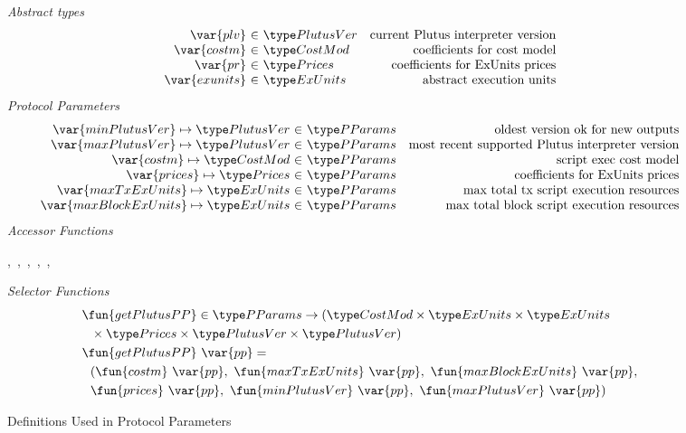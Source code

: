 \begin{figure*}[htb]
  \emph{Abstract types}
  \begin{equation*}
    \begin{array}{r@{~\in~}lr}
      \var{plv} & \PlutusVer & \text{current Plutus interpreter version}\\
      \var{costm} & \CostMod & \text{coefficients for cost model} \\
      \var{pr} & \Prices & \text{coefficients for ExUnits prices} \\
      \var{exunits} & \ExUnits & \text{abstract execution units} \\
    \end{array}
  \end{equation*}
  \emph{Protocol Parameters}
  \begin{equation*}
      \begin{array}{r@{~\in~}lr}
        \var{minPlutusVer} \mapsto \PlutusVer & \PParams & \text{oldest version ok for new outputs}\\
        \var{maxPlutusVer} \mapsto \PlutusVer & \PParams & \text{most recent supported Plutus interpreter version}\\
        \var{costm} \mapsto \CostMod & \PParams & \text{script exec cost model}\\
        \var{prices} \mapsto \Prices & \PParams & \text{coefficients for ExUnits prices} \\
        \var{maxTxExUnits} \mapsto \ExUnits & \PParams & \text{max total tx script execution resources}\\
        \var{maxBlockExUnits} \mapsto \ExUnits & \PParams & \text{max total block script execution resources}\\
      \end{array}
  \end{equation*}
  \emph{Accessor Functions}
  \begin{center}
  ,~,~,~,~,
  ~
  \end{center}
  \emph{Selector Functions}
  \begin{align*}
    & \fun{getPlutusPP} \in \PParams \to (\CostMod \times \ExUnits \times \ExUnits  \\
    & ~~ \times \Prices \times \PlutusVer \times \PlutusVer) \\
    & \fun{getPlutusPP}~\var{pp} = \\
    &~~ (\fun{costm}~\var{pp},~\fun{maxTxExUnits}~\var{pp},~\fun{maxBlockExUnits}~\var{pp}, \\
    &~~\fun{prices}~\var{pp},~\fun{minPlutusVer}~\var{pp},~\fun{maxPlutusVer}~\var{pp})
  \end{align*}
  \caption{Definitions Used in Protocol Parameters}
  \label{fig:defs:protocol-parameters}
\end{figure*}

\clearpage
